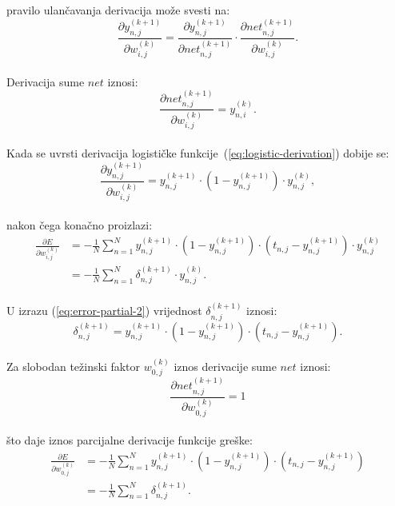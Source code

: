 pravilo ulančavanja derivacija može svesti na:\\
\begin{equation}
    \frac{\partial y_{n, j}^{(k + 1)}}{\partial w_{i, j}^{(k)}} =
    \frac{\partial y_{n, j}^{(k + 1)}}{\partial net_{n, j}^{(k + 1)}} \cdot
    \frac{\partial net_{n, j}^{(k + 1)}}{\partial w_{i, j}^{(k)}}.\label{eq:y-partial-w-simplification}
\end{equation}\\
Derivacija sume $net$ iznosi:\\
\begin{equation}
    \frac{\partial net_{n, j}^{(k + 1)}}{\partial w_{i, j}^{(k)}} = y_{n, i}^{(k)}.\label{eq:net-w-derivation}
\end{equation}\\
Kada se uvrsti derivacija logističke funkcije\ (\ref{eq:logistic-derivation}) dobije se:\\
\begin{equation}
    \frac{\partial y_{n, j}^{(k + 1)}}{\partial w_{i, j}^{(k)}} = y_{n, j}^{(k + 1)} \cdot
    \left(1 - y_{n, j}^{(k + 1)}\right) \cdot y_{n, j}^{(k)},\label{eq:y-partial-w-final}
\end{equation}\\
nakon čega konačno proizlazi:\\
\begin{align}
    \frac{\partial E}{\partial w_{i, j}^{(k)}} & = -\frac{1}{N} \sum_{n = 1}^{N} y_{n, j}^{(k + 1)} \cdot
    \left(1 - y_{n, j}^{(k + 1)}\right) \cdot \left(t_{n, j} - y_{n, j}^{(k + 1)}\right) \cdot y_{n, j}^{(k)}\\
    & = -\frac{1}{N} \sum_{n = 1}^{N} \delta_{n, j}^{(k + 1)} \cdot y_{n, j}^{(k)}.\label{eq:error-partial-2}
\end{align}\\
U izrazu (\ref{eq:error-partial-2}) vrijednost $\delta_{n, j}^{(k + 1)}$ iznosi:\\
\begin{equation}
    \delta_{n, j}^{(k + 1)} = y_{n, j}^{(k + 1)} \cdot \left(1 - y_{n, j}^{(k + 1)}\right) \cdot
    \left(t_{n, j} - y_{n, j}^{(k + 1)}\right).\label{eq:delta-value}
\end{equation}\\
Za slobodan težinski faktor $w_{0, j}^{(k)}$ iznos derivacije sume $net$ iznosi:
\begin{equation}
    \frac{\partial net_{n, j}^{(k + 1)}}{\partial w_{0, j}^{(k)}} = 1\label{eq:net-w0-derivation}
\end{equation}\\
što daje iznos parcijalne derivacije funkcije greške:\\
\begin{align}
    \frac{\partial E}{\partial w_{0, j}^{(k)}} & = -\frac{1}{N} \sum_{n = 1}^{N} y_{n, j}^{(k + 1)} \cdot
    \left(1 - y_{n, j}^{(k + 1)}\right) \cdot \left(t_{n, j} - y_{n, j}^{(k + 1)}\right)\\
    & = -\frac{1}{N} \sum_{n = 1}^{N} \delta_{n, j}^{(k + 1)}.\label{eq:error-partial-w0}
\end{align}

